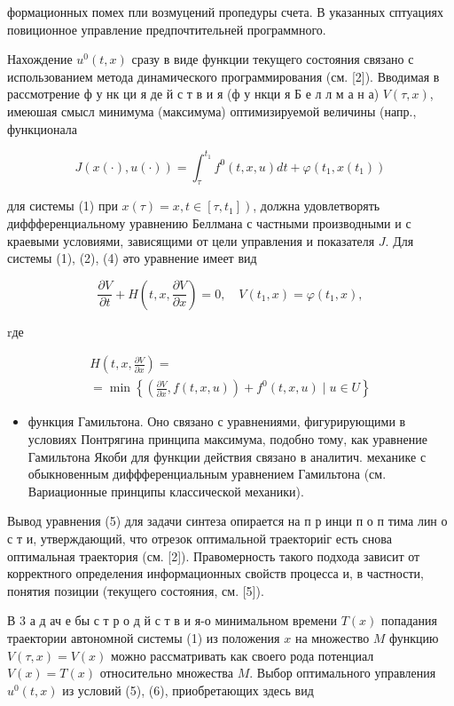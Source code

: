 \documentclass[10pt]{article}
\begin{document}
формационных помех пли возмуцений пропедуры счета. В указанных сптуациях повиционное управление предпочтительней программного.

Нахождение $u^{0}(t, x)$ сразу в виде функции текущего состояния связано с использованием метода динамического программирования (см. [2]). Вводимая в рассмотрение ф у нк ци я де й с т в и я (ф у нкци я Б е л л м а н а) $V(\tau, x)$, имеюшая смысл минимума (максимума) оптимизируемой величины (напр., функционала

\[
J(x(\cdot), u(\cdot))=\int_{\tau}^{t_{1}} f^{0}(t, x, u) d t+\varphi\left(t_{1}, x\left(t_{1}\right)\right)
\]

для системы (1) при $\left.x(\tau)=x, t \in\left[\tau, t_{1}\right]\right)$, должна удовлетворять диффференциальному уравнению Беллмана с частными производными и с краевыми условиями, зависящими от цели управления и показателя $J$. Для системы (1), (2), (4) әто уравнение имеет вид

\[
\frac{\partial V}{\partial t}+H\left(t, x, \frac{\partial V}{\partial x}\right)=0, \quad V\left(t_{1}, x\right)=\varphi\left(t_{1}, x\right),
\]

rде

\[
\begin{gathered}
H\left(t, x, \frac{\partial V}{\partial x}\right)= \\
=\min \left\{\left(\frac{\partial V}{\partial x}, f(t, x, u)\right)+f^{0}(t, x, u) \mid u \in U\right\}
\end{gathered}
\]

\begin{itemize}
  \item функция Гамильтона. Оно связано с уравнениями, фигурирующими в условиях Понтрягина принципа максимума, подобно тому, как уравнение Гамильтона Якоби для функции действия связано в аналитич. механике с обыкновенным диффференциальным уравнением Гамильтона (см. Вариационные принципы классической механики).
\end{itemize}

Вывод уравнения (5) для задачи синтеза опирается на п р инци п о п тима лин о с т и, утверждающий, что отрезок оптимальной траекториіг есть снова оптимальная траектория (см. [2]). Правомерность такого подхода зависит от корректного определения информационных свойств процесса и, в частности, понятия позиции (текущего состояния, см. [5]).

В 3 а д ач е бы с т р о д й с т в и я-о минимальном времени $T(x)$ попадания траектории автономной системы (1) из положения $x$ на множество $M$ функцию $V(\tau, x)=V(x)$ можно рассматривать как своего рода потенциал $V(x)=T(x)$ относительно множества $M$. Выбор оптимального управления $u^{0}(t, x)$ из условий (5), (6), приобретающих здесь вид
\end{document}
